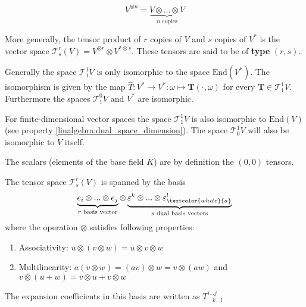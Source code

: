 	\begin{notation}
	    	\begin{equation}
	    		V^{\otimes n} = \underbrace{V\otimes...\otimes V}_{n\text{ copies}}
	    	\end{equation}
	\end{notation}
	\begin{remark}
	    	More generally, the tensor product of $r$ copies of $V$ and $s$ copies of $V^*$ is the vector space $\mathcal{T}^r_s(V) = V^{\otimes r}\otimes V^{*\otimes s}$. These tensors are said to be of \textbf{type} $(r, s)$.
	\end{remark}
	
	\begin{remark}
		Generally the space $\mathcal{T}^1_1V$ is only isomorphic to the space $\text{End}(V^*)$. The isomorphism is given by the map $\hat{T}:V^*\rightarrow V^*:\omega\mapsto\mathbf{T}(\cdot, \omega)$ for every $\mathbf{T}\in\mathcal{T}^1_1V$. Furthermore the spaces $\mathcal{T}^0_1V$ and $V^*$ are isomorphic.
		
		For finite-dimensional vector spaces the space $\mathcal{T}^1_1V$ is also isomorphic to $\text{End}(V)$ (see property \ref{linalgebra:dual_space_dimension}). The space $\mathcal{T}^1_0V$ will also be isomorphic to $V$ itself.
	\end{remark}
	\begin{definition}
	    	The scalars (elements of the base field $K$) are by definition the $(0,0)$ tensors.
	\end{definition}

	\begin{adefinition}\label{tensor:type}
    		The tensor space $\mathcal{T}^r_s(V)$ is spanned by the basis \[\underbrace{e_i\otimes...\otimes e_j}_{r\text{ basis vector}}\otimes\underbrace{\varepsilon^k\otimes...\otimes \varepsilon^l_{\textcolor{white}{a}}}_{s\text{ dual basis vectors}}\] where the operation $\otimes$ satisfies following properties:
        	\begin{enumerate}
        		\item Associativity: $u\otimes(v\otimes w) = u \otimes v\otimes w$
		        \item Multilinearity: $a(v\otimes w) = (av)\otimes w = v\otimes (aw)$ and $v\otimes (u+w) = v\otimes u + v\otimes w$
	        \end{enumerate}
	        The expansion coefficients in this basis are written as $T^{i...j}_{\ \ \ \ k...l}$
	\end{adefinition}

